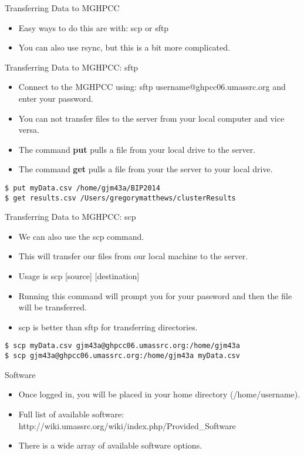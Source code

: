 \begin{frame}{Transferring Data to MGHPCC}
\begin{itemize}
\item Easy ways to do this are with: scp or sftp
\item You can also use rsync, but this is a bit more complicated.
\end{itemize}
\end{frame}


\begin{frame}{Transferring Data to MGHPCC: sftp}
\begin{itemize}
\item Connect to the MGHPCC using: sftp username@ghpcc06.umassrc.org and enter your password.  
\item You can not transfer files to the server from your local computer and vice versa.  
\item The command {\bf put} pulls a file from your local drive to the server.
\item The command {\bf get} pulls a file from your the server to your local drive.
\end{itemize}
{\tt \$ put myData.csv /home/gjm43a/BIP2014}\\
{\tt \$ get results.csv /Users/gregorymatthews/clusterResults}
\end{frame}

\begin{frame}{Transferring Data to MGHPCC: scp}
\begin{itemize}
\item We can also use the scp command.
\item This will transfer our files from our local machine to the server. 
\item Usage is scp [source] [destination]
\item Running this command will prompt you for your password and then the file will be transferred.  
\item scp is better than sftp for transferring directories.  
\end{itemize}
{\tt \$ scp myData.csv gjm43a@ghpcc06.umassrc.org:/home/gjm43a}\\
{\tt \$ scp gjm43a@ghpcc06.umassrc.org:/home/gjm43a myData.csv}
\end{frame}


\begin{frame}{Software}
\begin{itemize}
\item Once logged in, you will be placed in your home directory (/home/username). 
\item Full list of available software: http://wiki.umassrc.org/wiki/index.php/Provided\_Software  
\item There is a wide array of available software options. 
\end{itemize}
\end{frame}

